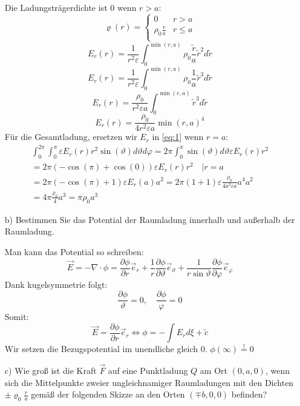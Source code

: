 \documentclass{scrartcl}
\let\*\cdot
\let\>\Leftrightarrow
\begin{document}
\begin{itemize}
Die Ladungsträgerdichte ist $0$ wenn $r>a$:
\[\varrho(r)=\begin{cases} 
      0 & r>a \\
      \rho_0 \frac{r}{a} & r\leq a\\
   \end{cases}\]
\[ E_r(r)     =\frac{1}{r^2 \varepsilon} \int_0^{\min(r,a)} \rho_0 \frac{\tilde{r}}{a} \tilde{r}^2d\tilde{r} \]
\[ E_r(r)     =\frac{1}{r^2 \varepsilon} \int_0^{\min(r,a)} \rho_0 \frac{1}{a} \tilde{r}^3 d\tilde{r} \]
\[ E_r(r)     =\frac{\rho_0}{r^2 \varepsilon a} \int_0^{\min(r,a)} \tilde{r}^3 d\tilde{r} \]
\[ E_r(r)     =\frac{\rho_0}{4 r^2 \varepsilon a} {\min(r,a)}^4 \]
Für die Gesamtladung, ersetzen wir $E_r$ in \eqref{eq:1} wenn $r=a$:
\begin{gather*}
    \int_0^{2\pi} \int_0^\pi \varepsilon E_r(r)  r^2 \sin(\vartheta) d\vartheta d\varphi = 2\pi \int_0^\pi \sin(\vartheta) d\vartheta \varepsilon E_r(r)  r^2\\
=2\pi \left(-\cos(\pi)+\cos(0)\right) \varepsilon  E_r(r)  r^2 \quad | r=a\\
=2\pi \left(-\cos(\pi)+1\right) \varepsilon  E_r(a)  a^2 = 2\pi \left(1+1\right) \varepsilon  \frac{\rho_0}{4 a^2 \varepsilon a} a^4   a^2\\
= 4\pi \frac{\rho_0}{4} a^3=\pi\rho_0 a^3
\end{gather*}


    \item[b)]
     Bestimmen Sie das Potential der Raumladung innerhalb und außerhalb der Raumladung.
     
     Man kann das Potential so schreiben:
     \[\vec{E}=- \nabla \* \phi=\frac{\partial \phi}{\partial r}\vec{e}_r+\frac{1}{r}\frac{\partial \phi}{\partial \vartheta}\vec{e}_\vartheta+\frac{1}{r \sin{\vartheta}}\frac{\partial \phi}{\partial \varphi}\vec{e}_\varphi\]
     Dank kugelsymmetrie folgt:
     \[\frac{\partial \phi}{\vartheta}=0,\quad\frac{\partial \phi}{\varphi}=0\]
Somit:
\[\vec{E}=\frac{\partial \phi}{\partial r}\vec{e}_r \> \phi = -\int E_r d\xi +\tilde{c}\]
Wir setzen die Bezugspotential im unendliche gleich 0. \(\phi(\infty)\overset{!}{=}0\)


    \item[c)]
     Wie groß ist die Kraft $\vec{F}$ auf eine Punktladung $Q$ am Ort $(0, a, 0)$, wenn sich die Mittelpunkte
zweier ungleichnamiger Raumladungen mit den Dichten $\pm\varrho_0\frac{r}{a}$ gemäß der folgenden Skizze an
den Orten $(\mp b, 0, 0)$ befinden?
\end{itemize}
\end{document}
